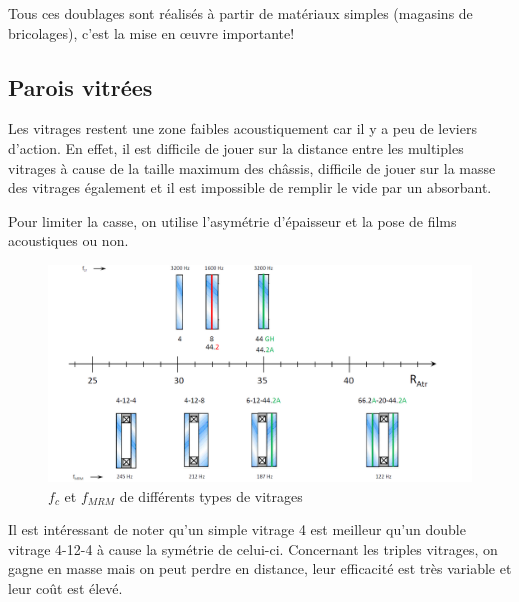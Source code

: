 \documentclass[11pt]{report}
\begin{document}
Tous ces doublages sont réalisés à partir de matériaux simples (magasins de bricolages), c'est la mise en œuvre importante! 



\subsection{Parois vitrées}
Les vitrages restent une zone faibles acoustiquement car il y a peu de leviers d'action. En effet, il est difficile de jouer sur la distance entre les multiples vitrages à cause de la taille maximum des châssis, difficile de jouer sur la masse des vitrages également et il est impossible de remplir le vide par un absorbant.

Pour limiter la casse, on utilise l'asymétrie d'épaisseur et la pose de films acoustiques ou non.

\begin{figure}[ht]
\centering
\includegraphics[width=0.6\linewidth]{vitr}
\caption{$f_c$ et $f_{MRM}$ de différents types de vitrages}
\label{diz}
\end{figure}

Il est intéressant de noter qu'un simple vitrage 4 est meilleur qu'un double vitrage 4-12-4 à cause la symétrie de celui-ci. Concernant les triples vitrages, on gagne en masse mais on peut perdre en distance, leur efficacité est très variable et leur coût est élevé.



































 
\end{document}
